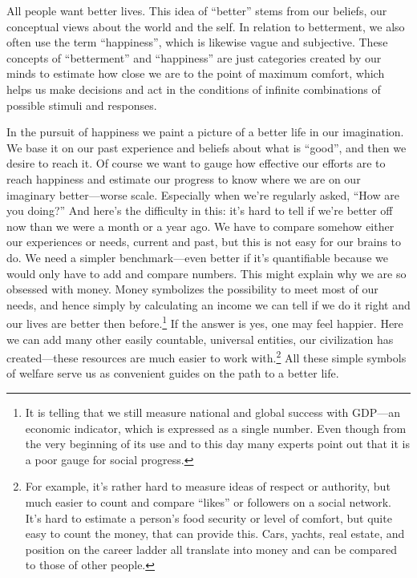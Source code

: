 \documentclass[12pt]{report}
\begin{document}
All people want better lives. This idea of ``better'' stems from our beliefs, our conceptual views about the world and the self. In relation to betterment, we also often use the term ``happiness'', which is likewise vague and subjective. These concepts of ``betterment'' and ``happiness'' are just categories created by our minds to estimate how close we are to the point of maximum comfort, which helps us make decisions and act in the conditions of infinite combinations of possible stimuli and responses.

\noindent In the pursuit of happiness we paint a picture of a better life in our imagination. We base it on our past experience and beliefs about what is ``good'', and then we desire to reach it. Of course we want to gauge how effective our efforts are to reach happiness and estimate our progress to know where we are on our imaginary better---worse scale. Especially when we’re regularly asked, ``How are you doing?'' And here’s the difficulty in this: it’s hard to tell if we’re better off now than we were a month or a year ago. We have to compare somehow either our experiences or needs, current and past, but this is not easy for our brains to do. We need a simpler benchmark\thinspace---\thinspace even better if it’s quantifiable because we would only have to add and compare numbers. This might explain why we are so obsessed with money. Money symbolizes the possibility to meet most of our needs, and hence simply by calculating an income we can tell if we do it right and our lives are better then before.\footnote{It is telling that we still measure national and global success with GDP\thinspace---\thinspace an economic indicator, which is expressed as a single number. Even though from the very beginning of its use and to this day many experts point out that it is a poor gauge for social progress.} If the answer is yes, one may feel happier. Here we can add many other easily countable, universal entities, our civilization has created\thinspace---\thinspace these resources are much easier to work with.\footnote{For example, it’s rather hard to measure ideas of respect or authority, but much easier to count and compare ``likes'' or followers on a social network. It’s hard to estimate a person’s food security or level of comfort, but quite easy to count the money, that can provide this. Cars, yachts, real estate, and position on the career ladder all translate into money and can be compared to those of other people.} All these simple symbols of welfare serve us as convenient guides on the path to a better life.
\end{document}
